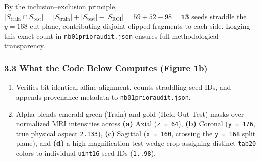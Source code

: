 \documentclass[10pt,a4paper]{article}
\renewcommand{\_}{\origunderscore\allowbreak}
\begin{document}
By the inclusion--exclusion principle, $|S_{\text{train}} \cap S_{\text{test}}| = |S_{\text{train}}| + |S_{\text{test}}| - |S_{\text{ROI}}| = 59 + 52 - 98 = \mathbf{13}$ seeds straddle the $y = 168$ cut plane, contributing disjoint clipped fragments to each side. Logging this exact count in \texttt{nb01\_prior\_audit.json} ensures full methodological transparency.

\subsubsection*{3.3 What the Code Below Computes (Figure 1b)}
\begin{enumerate}
\item Verifies bit-identical affine alignment, counts straddling seed IDs, and appends provenance metadata to \texttt{nb01\_prior\_audit.json}.
\item Alpha-blends emerald green (Train) and gold (Held-Out Test) masks over normalized MRI intensities across \textbf{(a)} Axial (\texttt{z = 64}), \textbf{(b)} Coronal (\texttt{y = 176}, true physical aspect \texttt{2.133}), \textbf{(c)} Sagittal (\texttt{x = 160}, crossing the \texttt{y = 168} split plane), and \textbf{(d)} a high-magnification test-wedge crop assigning distinct \texttt{tab20} colors to individual \texttt{uint16} seed IDs (\texttt{1..98}).
\end{enumerate}
\end{document}
